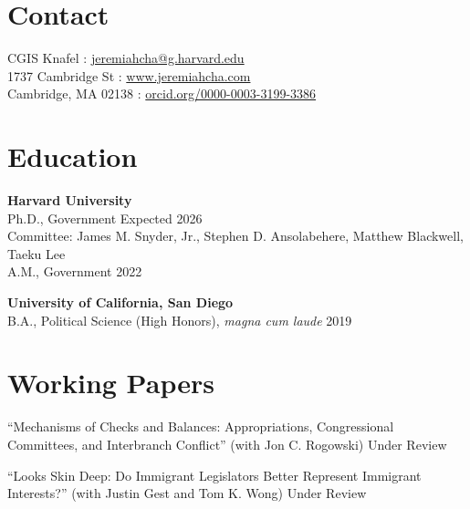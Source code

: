 \documentclass[margin, line]{res}
\begin{document}
\begin{resume}

\section{Contact}
CGIS Knafel \hfill \Letter: \href{mailto:jeremiahcha@g.harvard.edu}{jeremiahcha@g.harvard.edu}\\
1737 Cambridge St \hfill \Mundus: \href{httsp://www.jeremiahcha.com}{www.jeremiahcha.com}\\
Cambridge, MA 02138 \hfill \Mundus: \href{https://orcid.org/0000-0003-3199-3386}{orcid.org/0000-0003-3199-3386}

\section{Education}
\textbf{Harvard University}\\
\hspace*{5mm} Ph.D., Government \hfill Expected 2026\\
\hspace*{10mm} {\footnotesize Committee: James M. Snyder, Jr., Stephen D. Ansolabehere, Matthew Blackwell, Taeku Lee}\\
\hspace*{5mm} A.M., Government \hfill 2022

\textbf{University of California, San Diego}\\
\hspace*{5mm} B.A., Political Science (High Honors), \textit{magna cum laude} \hfill 2019

\section{Working Papers}
\begin{etaremune}
	\item ``Mechanisms of Checks and Balances: Appropriations, Congressional Committees, and Interbranch Conflict'' (with Jon C. Rogowski) \hfill Under Review 
	\item ``Looks Skin Deep: Do Immigrant Legislators Better Represent Immigrant Interests?'' (with Justin Gest and Tom K. Wong) \hfill Under Review
\end{etaremune}


\end{resume}
\end{document}
